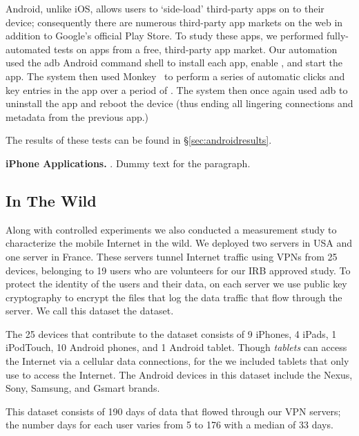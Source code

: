   Android, unlike iOS, allows users to `side-load' third-party apps on to their device; consequently there are numerous third-party app markets on the web in addition to Google's official Play Store.
  To study these apps, we performed fully-automated tests on  apps from a free, third-party app market.
  Our automation used the adb Android command shell to install each app, enable \platname, and start the app.
  The system then used Monkey~\cite{} to perform a series of automatic clicks and key entries in the app over a period of .
  The system then once again used adb to uninstall the app and reboot the device (thus ending all lingering connections and metadata from the previous app.)

  The results of these tests can be found in \S\ref{sec:androidresults}.

  {\bf iPhone Applications.}
. 
Dummy text for the paragraph.

\subsection{In The Wild}

Along with controlled experiments we also conducted a measurement study to characterize the mobile Internet in the wild.
We deployed two \platname servers in USA and one server in France. 
These servers tunnel Internet traffic using VPNs from 25 devices, belonging to 19 users who are volunteers for our IRB approved study.
To protect the identity of the users and their data, on each server we use public key cryptography to encrypt the files that log the data traffic that flow through the server. 
We call this dataset the \moball dataset. 

The 25 devices that contribute to the \moball dataset consists of 9 iPhones, 4 iPads, 1 iPodTouch, 10 Android phones, and 1 Android tablet.
Though \emph{tablets} can access the Internet via a cellular data connections, for the \moball we included tablets that only use \wifi to access the Internet.
The Android devices in this dataset include the Nexus, Sony, Samsung, and Gsmart brands.

This dataset consists of 190 days of data that flowed through our VPN servers; the number days for each user varies from 5 to 176 with a median of 33 days.

